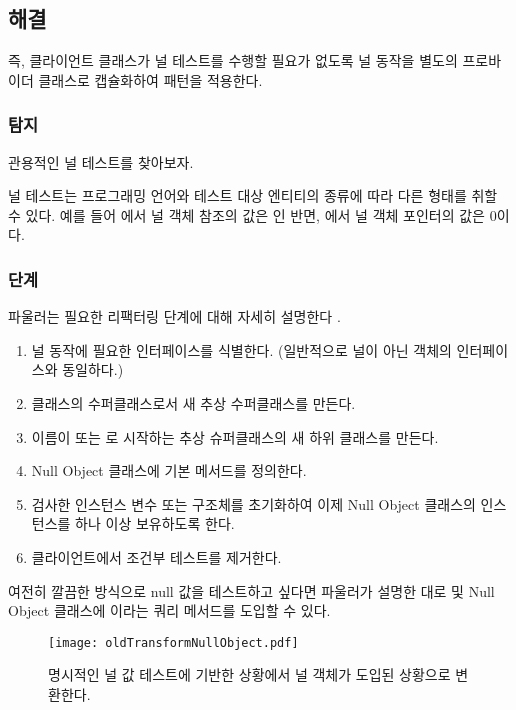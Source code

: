 \documentclass[a4paper,10pt,twoside]{book}
\begin{document}
\subsection*{해결}

즉, 클라이언트 클래스가 널 테스트를 수행할 필요가 없도록 널 동작을 별도의 프로바이더 클래스로 캡슐화하여  패턴을 적용한다.

\subsubsection*{탐지}

관용적인 널 테스트를 찾아보자. 

널 테스트는 프로그래밍 언어와 테스트 대상 엔티티의 종류에 따라 다른 형태를 취할 수 있다. 예를 들어 에서 널 객체 참조의 값은 인 반면, 에서 널 객체 포인터의 값은 0이다.

\subsubsection*{단계}

파울러는 필요한 리팩터링 단계에 대해 자세히 설명한다 \cite{Fowl99a}.
\begin{enumerate}
\item 널 동작에 필요한 인터페이스를 식별한다. (일반적으로 널이 아닌 객체의 인터페이스와 동일하다.)

\item {} 클래스의 수퍼클래스로서 새 추상 수퍼클래스를 만든다.

\item 이름이  또는 로 시작하는 추상 슈퍼클래스의 새 하위 클래스를 만든다.

\item Null Object 클래스에 기본 메서드를 정의한다.

\item 검사한 인스턴스 변수 또는 구조체를 초기화하여 이제 Null Object 클래스의 인스턴스를 하나 이상 보유하도록 한다.

\item 클라이언트에서 조건부 테스트를 제거한다.
\end{enumerate}

여전히 깔끔한 방식으로 null 값을 테스트하고 싶다면 파울러\cite{Fowl99a}가 설명한 대로  및 Null Object 클래스에 이라는 쿼리 메서드를 도입할 수 있다.

\begin{figure}
\begin{center}
\texttt{[image: oldTransformNullObject.pdf]}
\caption{명시적인 널 값 테스트에 기반한 상황에서 널 객체가 도입된 상황으로 변환한다.}
\end{center}
\end{figure}
\end{document}
